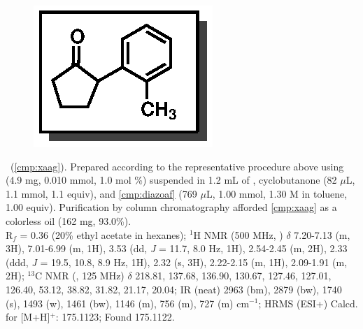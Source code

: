 \vspace{10pt}
\begin{figure}
  \vspace{-25pt}
  \begin{center}
    \includegraphics[scale=0.8]{chp_asymmetric/images/xaag}
  \end{center}
  \vspace{-30pt}
\end{figure}\noindent \textbf{\CMPxaag}\ (\ref{cmp:xaag}). Prepared
according to the representative procedure above using  (4.9 mg,
0.010 mmol, 1.0 mol \%) suspended in 1.2 mL of , cyclobutanone (82
$\mu$L, 1.1 mmol, 1.1 equiv), and \ref{cmp:diazoaf} (769 $\mu$L, 1.00 mmol,
1.30 M in toluene, 1.00 equiv). Purification by column chromatography afforded
\ref{cmp:xaag} as a colorless oil (162 mg, 93.0\%).\\
R$_f$ = 0.36 (20\% ethyl acetate in hexanes); $^1$H NMR (500 MHz, )
$\delta$ 7.20-7.13 (m, 3H), 7.01-6.99 (m, 1H), 3.53 (dd, \textit{J} = 11.7, 8.0
Hz, 1H), 2.54-2.45 (m, 2H), 2.33 (ddd, \textit{J} = 19.5, 10.8, 8.9 Hz, 1H),
2.32 (s, 3H), 2.22-2.15 (m, 1H), 2.09-1.91 (m, 2H); $^{13}$C NMR (,
125 MHz) $\delta$ 218.81, 137.68, 136.90, 130.67, 127.46, 127.01, 126.40, 53.12,
38.82, 31.82, 21.17, 20.04; IR (neat) 2963 (bm), 2879 (bw), 1740 (s), 1493 (w),
1461 (bw), 1146 (m), 756 (m), 727 (m) cm$^{-1}$; HRMS (ESI+) Calcd. for
 [M+H]$^+$: 175.1123; Found 175.1122. 

